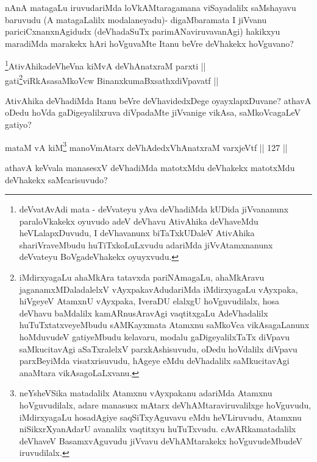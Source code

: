 \begin{artha}
nAnA matagaLu iruvudariMda loVkAMtaragamana viSayadalilx
saMshayavu baruvudu  (A matagaLalilx modalaneyadu)- digaMbaramata I jiVvanu
pariciCxnanxnAgidudx (deVhadaSuTx parimANaviruvavanAgi) hakikxyu
maradiMda marakekx hAri hoVguvaMte Itanu beVre deVhakekx hoVguvano?
\end{artha}



\begin{shl}
\footnote{deVvatAvAdi mata - deVvateyu yAva deVhadiMda kUDida
jiVvananunx paraloVkakekx oyuvudo adeV deVhavu AtivAhika deVhaveMdu
heVLalapxDuvudu, I deVhavanunx biTaTxkUDaleV AtivAhika
shariVraveMbudu huTiTxkoLuLxvudu adariMda jiVvAtamxnanunx deVvateyu
BoVgadeVhakekx oyuyxvudu.}AtivAhikadeVheVna kiMvA deVhAnatxraM parxti || \\
gati\footnote{iMdirxyagaLu ahaMkAra tatavxda
pariNAmagaLu, ahaMkAravu jaganamxMDaladalelxV vAyxpakavAdudariMda
iMdirxyagaLu vAyxpaka, hiVgeyeV AtamxnU vAyxpaka, IveraDU elalxgU
hoVguvudilalx, hosa deVhavu baMdalilx kamARnusAravAgi vaqtitxgaLu
AdeVhadalilx huTuTxtatxveyeMbudu sAMKayxmata Atamxnu saMkoVca
vikAsagaLanunx hoMduvudeV gatiyeMbudu kelavaru, modalu
gaDigeyalilxTaTx diVpavu saMkucitavAgi aSaTxralelxV parxkAshisuvudu,
oDedu hoVdalilx diVpavu parxBeyiMda visatxrisuvudu, hAgeye eMdu
deVhadalilx saMkucitavAgi anaMtara vikAsagoLaLxvanu.}viRkAsasaMkoVcw BinanxkumaBxsathxdiVpavatf || 
\end{shl}


\begin{artha}
AtivAhika deVhadiMda Itanu beVre deVhavidedxDege
oyayxlapxDuvane? athavA oDedu hoVda gaDigeyalilxruva diVpadaMte
jiVvanige vikAsa, saMkoVcagaLeV gatiyo?
\end{artha}



\begin{shl}
mataM vA kiM\footnote{neYsheVSika matadalilx Atamxnu vAyxpakanu adariMda Atamxnu
hoVguvudilalx, adare manasusx mAtarx deVhAMtaraviruvalilxge
hoVguvudu, iMdirxyagaLu hosadAgiye saqSiTxyAguvavu eMdu heVLiruvudu,
Atamxnu niSikxrXyanAdarU avanalilx vaqtitxyu
huTuTxvudu. cAvARkamatadalilx deVhaveV BasamxvAguvudu jiVvavu
deVhAMtarakekx hoVguvudeMbudeV iruvudilalx.} manoVmAtarx deVhAdedxVhAnatxraM varxjeVtf \hfill || 127 ||  
\end{shl}

\begin{artha}
athavA keVvala manasesxV deVhadiMda matotxMdu deVhakekx
matotxMdu deVhakekx saMcarisuvudo?
\end{artha}


